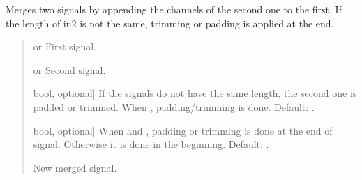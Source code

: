 \documentclass[letterpaper,10pt,english]{sphinxmanual}
\begin{document}
\begin{fulllineitems}
\label{\detokenize{modules/dsptoolbox.standard_functions:dsptoolbox.standard_functions.merge_signals}}
\pysigstartsignatures
{}
\pysigstopsignatures
\sphinxAtStartPar
Merges two signals by appending the channels of the second one to the
first. If the length of in2 is not the same, trimming or padding is
applied at the end.
\begin{quote}\begin{description}
\begin{description}
\sphinxlineitem{\sphinxstylestrong{in1}}{[} or \sphinxtitleref{MultiBandSignal}{]}
\sphinxAtStartPar
First signal.

\sphinxlineitem{\sphinxstylestrong{in2}}{[} or \sphinxtitleref{MultiBandSignal}{]}
\sphinxAtStartPar
Second signal.

\sphinxlineitem{\sphinxstylestrong{padding\_trimming}}{[}bool, optional{]}
\sphinxAtStartPar
If the signals do not have the same length, the second one is padded
or trimmed. When , padding/trimming is done.
Default: .

\sphinxlineitem{\sphinxstylestrong{at\_end}}{[}bool, optional{]}
\sphinxAtStartPar
When  and , padding or trimming is done
at the end of signal. Otherwise it is done in the beginning.
Default: .

\end{description}

\begin{description}
\sphinxlineitem{\sphinxstylestrong{new\_sig}}{[}\sphinxtitleref{Signal}{]}
\sphinxAtStartPar
New merged signal.

\end{description}

\end{description}\end{quote}

\end{fulllineitems}
\end{document}

